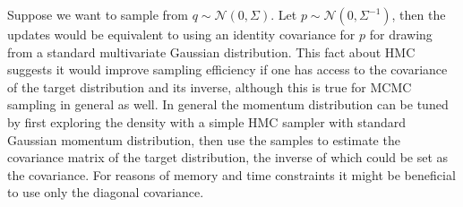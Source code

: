 \documentclass[12pt]{report}
\begin{document}
Suppose we want to sample from $q \sim \mathcal{N}(0,\Sigma)$. Let $p \sim
\mathcal{N}(0,\Sigma^{-1})$, then the updates would be equivalent to using an
identity covariance for $p$ for drawing from a standard multivariate Gaussian
distribution. This
fact about HMC suggests it would improve sampling efficiency if one has
access to the covariance of the target distribution and its inverse, although this is true for
MCMC sampling in general as well. 
In general the momentum distribution can be tuned by first exploring the density
with a simple HMC sampler with standard Gaussian momentum distribution, then use
the samples to estimate the covariance matrix of the target distribution, the
inverse of which could be set as the covariance.  For reasons of memory and time constraints it might be beneficial to use only the diagonal covariance. 
\end{document}
